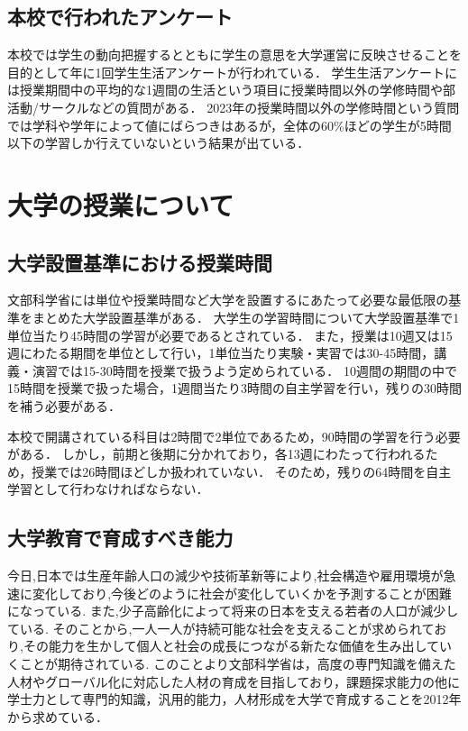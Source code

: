 \documentclass[12pt,a4j,titlepage]{ltjsarticle}
\begin{document}



\subsection{本校で行われたアンケート}
本校では学生の動向把握するとともに学生の意思を大学運営に反映させることを目的として年に1回学生生活アンケートが行われている．
学生生活アンケートには授業期間中の平均的な1週間の生活という項目に授業時間以外の学修時間や部活動/サークルなどの質問がある．
2023年の授業時間以外の学修時間という質問では学科や学年によって値にばらつきはあるが，全体の60\%ほどの学生が5時間以下の学習しか行えていないという結果が出ている\cite{chiba}．

\clearpage

\section{大学の授業について}
\subsection{大学設置基準における授業時間}
文部科学省には単位や授業時間など大学を設置するにあたって必要な最低限の基準をまとめた大学設置基準がある．
大学生の学習時間について大学設置基準で1単位当たり45時間の学習が必要であるとされている．
また，授業は10週又は15週にわたる期間を単位として行い，1単位当たり実験・実習では30-45時間，講義・演習では15-30時間を授業で扱うよう定められている．
10週間の期間の中で15時間を授業で扱った場合，1週間当たり3時間の自主学習を行い，残りの30時間を補う必要がある．

本校で開講されている科目は2時間で2単位であるため，90時間の学習を行う必要がある．
しかし，前期と後期に分かれており，各13週にわたって行われるため，授業では26時間ほどしか扱われていない．
そのため，残りの64時間を自主学習として行わなければならない．

\subsection{大学教育で育成すべき能力}
今日,日本では生産年齢人口の減少や技術革新等により,社会構造や雇用環境が急速に変化しており,今後どのように社会が変化していくかを予測することが困難になっている.
また,少子高齢化によって将来の日本を支える若者の人口が減少している.
そのことから,一人一人が持続可能な社会を支えることが求められており,その能力を生かして個人と社会の成長につながる新たな価値を生み出していくことが期待されている.
このことより文部科学省は，高度の専門知識を備えた人材やグローバル化に対応した人材の育成を目指しており，課題探求能力の他に学士力として専門的知識，汎用的能力，人材形成を大学で育成することを2012年から求めている．
\end{document}
